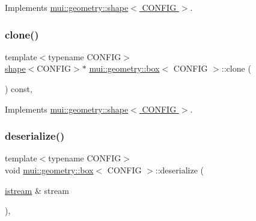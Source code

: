 Implements \hyperlink{classmui_1_1geometry_1_1shape_adf598ec651ea425553bd8e617cac7430}{mui\+::geometry\+::shape$<$ C\+O\+N\+F\+I\+G $>$}.

\mbox{\label{classmui_1_1geometry_1_1box_aa7422049fe305395107f9cfd04c804bf}} 
\subsubsection{\texorpdfstring{clone()}{clone()}}
{\footnotesize\ttfamily template$<$typename C\+O\+N\+F\+IG$>$ \\
\hyperlink{classmui_1_1geometry_1_1shape}{shape}$<$C\+O\+N\+F\+IG$>$$\ast$ \hyperlink{classmui_1_1geometry_1_1box}{mui\+::geometry\+::box}$<$ C\+O\+N\+F\+IG $>$\+::clone (\begin{DoxyParamCaption}{ }\end{DoxyParamCaption}) const\hspace{0.3cm}{\ttfamily [inline]}, {\ttfamily [virtual]}}



Implements \hyperlink{classmui_1_1geometry_1_1shape_a4d1307ebc40d462b13da89c811b3beb7}{mui\+::geometry\+::shape$<$ C\+O\+N\+F\+I\+G $>$}.

\mbox{\label{classmui_1_1geometry_1_1box_a35467a9cfe92d36b2b232b796f7959e7}} 
\subsubsection{\texorpdfstring{deserialize()}{deserialize()}}
{\footnotesize\ttfamily template$<$typename C\+O\+N\+F\+IG$>$ \\
void \hyperlink{classmui_1_1geometry_1_1box}{mui\+::geometry\+::box}$<$ C\+O\+N\+F\+IG $>$\+::deserialize (\begin{DoxyParamCaption}\item[{\hyperlink{classmui_1_1istream}{istream} \&}]{stream }\end{DoxyParamCaption})\hspace{0.3cm}{\ttfamily [inline]}, {\ttfamily [virtual]}}



